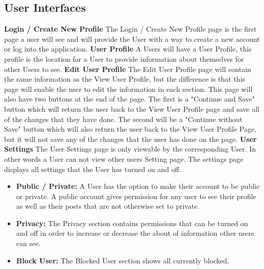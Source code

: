 \documentclass[letterpaper, 10, draftclsnofoot, onecolumn]{IEEEtran}
\begin{document}
\subsection{User Interfaces}
\noindent \textbf{Login / Create New Profile}
\newline
\indent The Login / Create New Profile page is the first page a user will see and will provide the User with a way to create a new account or log into the application.
\newline
\newline
\textbf{User Profile}
\newline
\indent A Users will have a User Profile, this profile is the location for a User to provide information about themselves for other Users to see. 
\newline
\newline
\noindent \textbf{Edit User Profile}
\newline
\indent The Edit User Profile page will contain the same information as the View User Profile, but the difference is that this page will enable the user to edit the information in each section. This page will also have two buttons at the end of the page. The first is a "Continue and Save" button which will return the user back to the View User Profile page and save all of the changes that they have done. The second will be a "Continue without Save" button which will also return the user back to the View User Profile Page, but it will not save any of the changes that the user has done on the page.
\newline
\newline
\textbf{User Settings}
\newline
\indent The User Settings page is only viewable by the corresponding User. In other words a User can not view other users Setting page. The settings page displays all settings that the User has turned on and off. 
\begin{itemize}
\item \textbf{Public / Private: } A User has the option to make their account to be public or private. A public account gives permission for any user to see their profile as well as their posts that are not otherwise set to private.
\item \textbf{Privacy: } The Privacy section contains permissions that can be turned on and off in order to increase or decrease the about of information other users can see. 
\item \textbf{Block User: } The Blocked User section shows all currently blocked.
\end{itemize}
\end{document}
